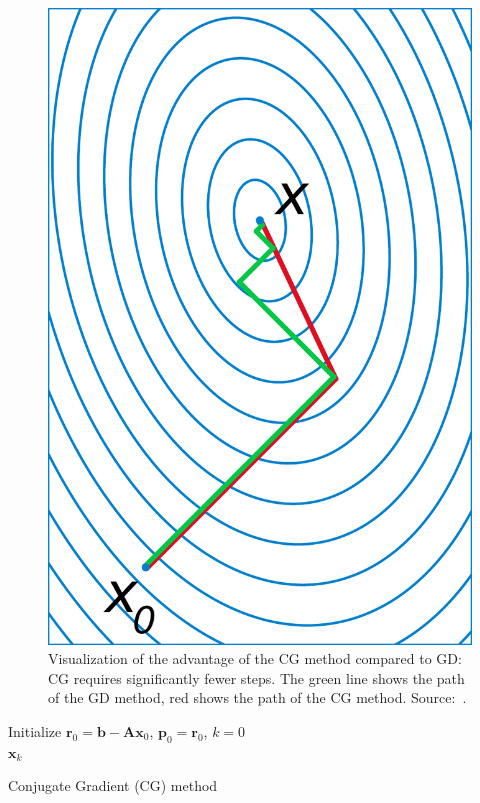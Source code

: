\begin{figure}
\begin{minipage}[t]{0.255\linewidth}
        \label{fig:grad_desc_problem}
    \end{minipage}
    \hspace{0.01\linewidth}
    \begin{minipage}[t]{0.29\linewidth}
        \centering
        \includegraphics[width=0.45\linewidth]{images/Conjugate_gradient_illustration.pdf}
        \caption{Visualization of the advantage of the CG method compared to GD: CG requires significantly fewer steps. The green line shows the path of the GD method, red shows the path of the CG method. Source:~\cite{alexandrov_illustration_2007}.}
        \label{fig:CG_vs_GD}
    \end{minipage}
\end{figure}


\begin{algorithm}
    \BlankLine
    Initialize $\mathbf{r}_0 = \mathbf{b} - \mathbf{Ax}_0$, $\mathbf{p}_0 = \mathbf{r}_0$, $k = 0$\\
    \Return $\mathbf{x}_k$
    \caption{Conjugate Gradient (CG) method}
    \label{alg:cg}
\end{algorithm}

